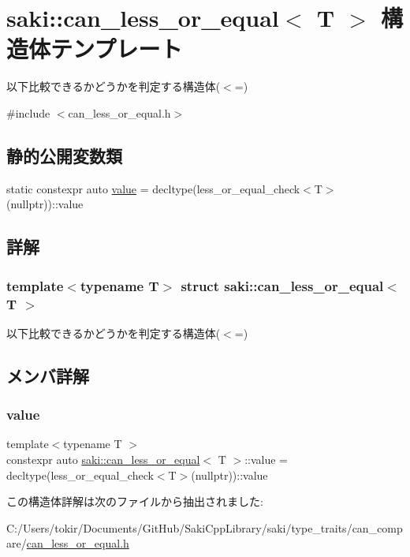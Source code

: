 \hypertarget{structsaki_1_1can__less__or__equal}{}\section{saki\+:\+:can\+\_\+less\+\_\+or\+\_\+equal$<$ T $>$ 構造体テンプレート}
\label{structsaki_1_1can__less__or__equal}


以下比較できるかどうかを判定する構造体($<$=)  




{\ttfamily \#include $<$can\+\_\+less\+\_\+or\+\_\+equal.\+h$>$}

\subsection*{静的公開変数類}
\begin{DoxyCompactItemize}
\item 
static constexpr auto \mbox{\hyperlink{structsaki_1_1can__less__or__equal_a5a0b1635454596a925eae248a7c7d94d}{value}} = decltype(less\+\_\+or\+\_\+equal\+\_\+check$<$T$>$(nullptr))\+::value
\end{DoxyCompactItemize}


\subsection{詳解}
\subsubsection*{template$<$typename T$>$\newline
struct saki\+::can\+\_\+less\+\_\+or\+\_\+equal$<$ T $>$}

以下比較できるかどうかを判定する構造体($<$=) 

\subsection{メンバ詳解}
\mbox{\label{structsaki_1_1can__less__or__equal_a5a0b1635454596a925eae248a7c7d94d}} 
\subsubsection{\texorpdfstring{value}{value}}
{\footnotesize\ttfamily template$<$typename T $>$ \\
constexpr auto \mbox{\hyperlink{structsaki_1_1can__less__or__equal}{saki\+::can\+\_\+less\+\_\+or\+\_\+equal}}$<$ T $>$\+::value = decltype(less\+\_\+or\+\_\+equal\+\_\+check$<$T$>$(nullptr))\+::value\hspace{0.3cm}{\ttfamily [static]}}



この構造体詳解は次のファイルから抽出されました\+:\begin{DoxyCompactItemize}
\item 
C\+:/\+Users/tokir/\+Documents/\+Git\+Hub/\+Saki\+Cpp\+Library/saki/type\+\_\+traits/can\+\_\+compare/\mbox{\hyperlink{can__less__or__equal_8h}{can\+\_\+less\+\_\+or\+\_\+equal.\+h}}\end{DoxyCompactItemize}
